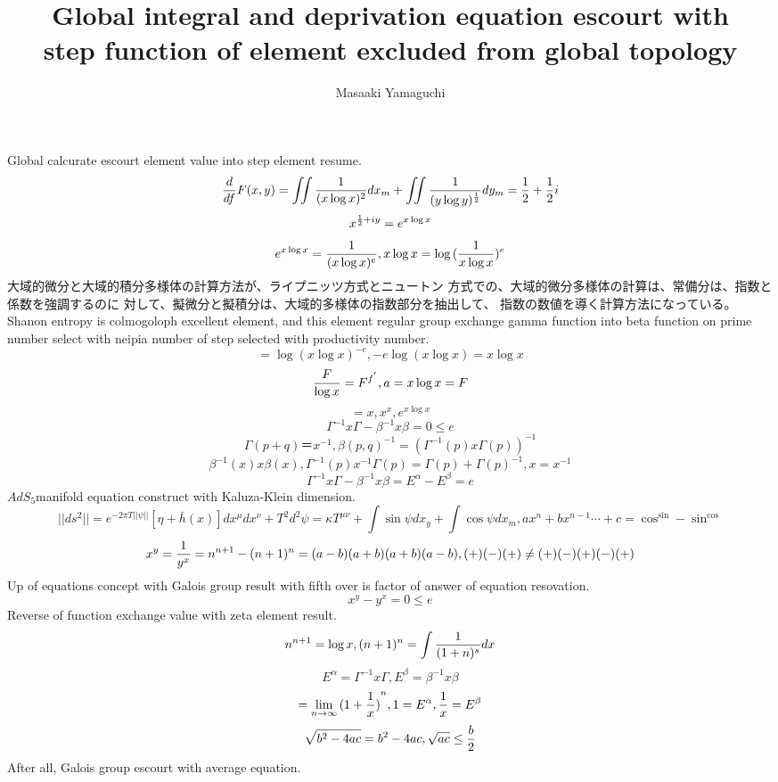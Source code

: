 \documentclass{jsarticle}
\begin{document}
\title{Global integral and deprivation equation escourt with \\
step function of element excluded from global topology}
\author{Masaaki Yamaguchi}
\date{}
\maketitle

  Global calcurate escourt element value into step element resume.
  $$ {d \over {d f}}F(x,y) = \iint{1 \over {(x\log x)^{2}}}dx_m
  + \iint{1 \over {(y\log y)^{1 \over 2}}}dy_m = {1 \over 2} + {1 \over 2}i $$
  $$ x^{{1 \over 2} + iy} = e^{x\log x} $$
  $$ e^{x \log x} = {1 \over {(x \log x)^{e}}}, x\log x = \log{({1 \over 
  {{x\log x}}})^{e}} $$
  大域的微分と大域的積分多様体の計算方法が、ライプニッツ方式とニュートン
  方式での、大域的微分多様体の計算は、常備分は、指数と係数を強調するのに
  対して、擬微分と擬積分は、大域的多様体の指数部分を抽出して、
  指数の数値を導く計算方法になっている。
  Shanon entropy is colmogoloph excellent element, and this element
  regular group exchange gamma function into beta function on
  prime number select with neipia number of step selected with productivity
  number.
  $$ = \log (x \log x)^{-e}, -e \log(x\log x) = x\log x $$
  $$ {F \over {\log x}} = F^{f^{'}}, a = x \log x = F $$
  $$ = x, x^x, e^{x\log x} $$
  $$ \Gamma^{-1}x\Gamma - \beta^{-1}x\beta = 0 \le e $$
  $$ \Gamma(p + q) ＝ x^{-1}, \beta(p,q)^{-1} = {(\Gamma^{-1}(p)x\Gamma(p))^{-1}
  } $$
  $$ \beta^{-1}(x)x\beta(x), \Gamma^{-1}(p)x^{-1}\Gamma(p)
  = \Gamma(p) + \Gamma(p)^{-1}, x = x^{-1} $$
  $$ \Gamma^{-1}x\Gamma - \beta^{-1}x\beta = E^{\alpha} - E^{\beta} = e $$
  $ AdS_{5} $manifold equation construct with Kaluza-Klein dimension.
  $$ ||ds^2|| = e^{-2\pi T||\psi||}[\eta + \bar{h}(x)]dx^{\mu}dx^{\nu}
  + T^2 d^2\psi = \kappa T^{\mu\nu} + \int \sin \psi dx_y + \int \cos \psi
  dx_m, ax^n + bx^{n-1} \cdots +c = \cos^{\sin} - \sin^{\cos} $$
  $$ x^y = {1 \over {y^x}} = n^{n+1} - (n + 1)^{n} = (a - b)(a + b)(a + b)
  (a - b), (+)(-)(+) \neq (+)(-)(+)(-)(+) $$
  Up of equations concept with Galois group result with fifth over is 
  factor of answer of equation resovation.
  $$ x^y - y^x = 0 \le e $$
  Reverse of function exchange value with zeta element result.
  $$ n^{n+1} = \log x, (n+1)^{n} = \int {1 \over {(1+n)^{s}}}dx $$
  $$ E^{\alpha} = \Gamma^{-1}x\Gamma, E^{\beta} = \beta^{-1}x\beta $$
  $$ = \lim_{n\to \infty}{(1 + {1 \over x})}^{n}, 1 = E^{\alpha},
  {1 \over x} = E^{\beta} $$
  $$ \sqrt{b^2 - 4ac} = b^2 - 4ac, \sqrt{ac} \le {b \over 2} $$
  After all, Galois group escourt with average equation.
\end{document}
